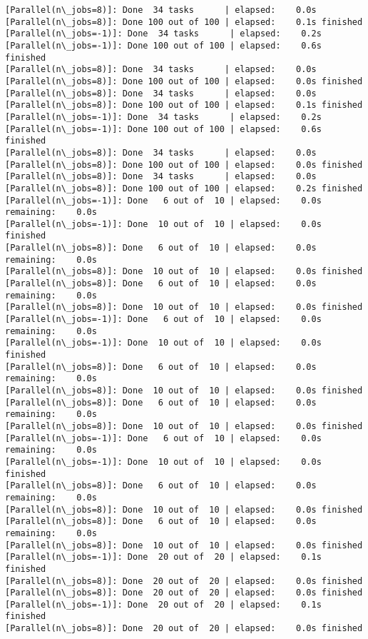 \documentclass[11pt]{article}
\begin{document}
\begin{Verbatim}[commandchars=\\\{\}]
[Parallel(n\_jobs=8)]: Done  34 tasks      | elapsed:    0.0s
[Parallel(n\_jobs=8)]: Done 100 out of 100 | elapsed:    0.1s finished
[Parallel(n\_jobs=-1)]: Done  34 tasks      | elapsed:    0.2s
[Parallel(n\_jobs=-1)]: Done 100 out of 100 | elapsed:    0.6s finished
[Parallel(n\_jobs=8)]: Done  34 tasks      | elapsed:    0.0s
[Parallel(n\_jobs=8)]: Done 100 out of 100 | elapsed:    0.0s finished
[Parallel(n\_jobs=8)]: Done  34 tasks      | elapsed:    0.0s
[Parallel(n\_jobs=8)]: Done 100 out of 100 | elapsed:    0.1s finished
[Parallel(n\_jobs=-1)]: Done  34 tasks      | elapsed:    0.2s
[Parallel(n\_jobs=-1)]: Done 100 out of 100 | elapsed:    0.6s finished
[Parallel(n\_jobs=8)]: Done  34 tasks      | elapsed:    0.0s
[Parallel(n\_jobs=8)]: Done 100 out of 100 | elapsed:    0.0s finished
[Parallel(n\_jobs=8)]: Done  34 tasks      | elapsed:    0.0s
[Parallel(n\_jobs=8)]: Done 100 out of 100 | elapsed:    0.2s finished
[Parallel(n\_jobs=-1)]: Done   6 out of  10 | elapsed:    0.0s remaining:    0.0s
[Parallel(n\_jobs=-1)]: Done  10 out of  10 | elapsed:    0.0s finished
[Parallel(n\_jobs=8)]: Done   6 out of  10 | elapsed:    0.0s remaining:    0.0s
[Parallel(n\_jobs=8)]: Done  10 out of  10 | elapsed:    0.0s finished
[Parallel(n\_jobs=8)]: Done   6 out of  10 | elapsed:    0.0s remaining:    0.0s
[Parallel(n\_jobs=8)]: Done  10 out of  10 | elapsed:    0.0s finished
[Parallel(n\_jobs=-1)]: Done   6 out of  10 | elapsed:    0.0s remaining:    0.0s
[Parallel(n\_jobs=-1)]: Done  10 out of  10 | elapsed:    0.0s finished
[Parallel(n\_jobs=8)]: Done   6 out of  10 | elapsed:    0.0s remaining:    0.0s
[Parallel(n\_jobs=8)]: Done  10 out of  10 | elapsed:    0.0s finished
[Parallel(n\_jobs=8)]: Done   6 out of  10 | elapsed:    0.0s remaining:    0.0s
[Parallel(n\_jobs=8)]: Done  10 out of  10 | elapsed:    0.0s finished
[Parallel(n\_jobs=-1)]: Done   6 out of  10 | elapsed:    0.0s remaining:    0.0s
[Parallel(n\_jobs=-1)]: Done  10 out of  10 | elapsed:    0.0s finished
[Parallel(n\_jobs=8)]: Done   6 out of  10 | elapsed:    0.0s remaining:    0.0s
[Parallel(n\_jobs=8)]: Done  10 out of  10 | elapsed:    0.0s finished
[Parallel(n\_jobs=8)]: Done   6 out of  10 | elapsed:    0.0s remaining:    0.0s
[Parallel(n\_jobs=8)]: Done  10 out of  10 | elapsed:    0.0s finished
[Parallel(n\_jobs=-1)]: Done  20 out of  20 | elapsed:    0.1s finished
[Parallel(n\_jobs=8)]: Done  20 out of  20 | elapsed:    0.0s finished
[Parallel(n\_jobs=8)]: Done  20 out of  20 | elapsed:    0.0s finished
[Parallel(n\_jobs=-1)]: Done  20 out of  20 | elapsed:    0.1s finished
[Parallel(n\_jobs=8)]: Done  20 out of  20 | elapsed:    0.0s finished

\end{Verbatim}
\end{document}

